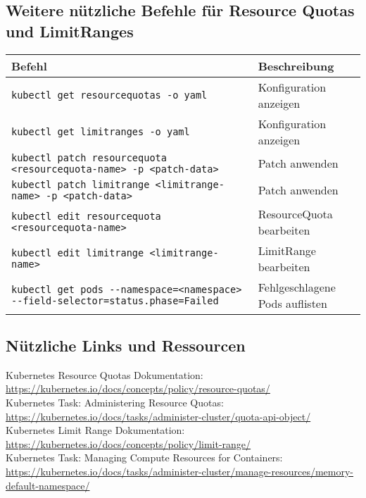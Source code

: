 \subsection{Weitere nützliche Befehle für Resource Quotas und LimitRanges}
\begin{tabular}{|p{}|p{}|}
\hline
\textbf{Befehl} & \textbf{Beschreibung} \\
\hline
\texttt{kubectl get resourcequotas -o yaml} & Konfiguration anzeigen \\
\texttt{kubectl get limitranges -o yaml} & Konfiguration anzeigen \\
\texttt{kubectl patch resourcequota <resourcequota-name> -p <patch-data>} & Patch anwenden \\
\texttt{kubectl patch limitrange <limitrange-name> -p <patch-data>} & Patch anwenden \\
\texttt{kubectl edit resourcequota <resourcequota-name>} & ResourceQuota bearbeiten \\
\texttt{kubectl edit limitrange <limitrange-name>} & LimitRange bearbeiten \\
\texttt{kubectl get pods {-}{-}namespace=<namespace> {-}{-}field-selector=status.phase=Failed} & Fehlgeschlagene Pods auflisten\\
\hline
\end{tabular}

\subsection*{Nützliche Links und Ressourcen}
Kubernetes Resource Quotas Dokumentation:\\
\url{https://kubernetes.io/docs/concepts/policy/resource-quotas/}\\
Kubernetes Task: Administering Resource Quotas:\\
\url{https://kubernetes.io/docs/tasks/administer-cluster/quota-api-object/}\\
Kubernetes Limit Range Dokumentation:\\
\url{https://kubernetes.io/docs/concepts/policy/limit-range/}\\
Kubernetes Task: Managing Compute Resources for Containers:\\
{\normalsize\ttfamily\href{https://kubernetes.io/docs/tasks/administer-cluster/manage-resources/memory-default-namespace/}{https://kubernetes.io/docs/tasks/administer-cluster/manage-resources/memory-default-namespace/}}




